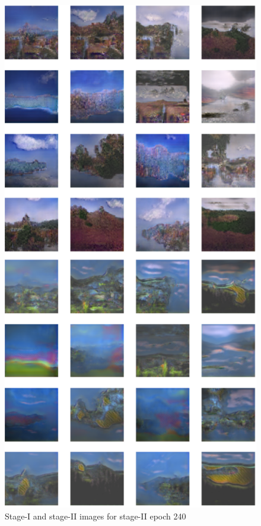 \documentclass{article}
\begin{document}
	\begin{figure}[h]
	\centering
	\includegraphics[scale=0.6]{images/epoch240_FID400.png}
	\caption{Stage-I and stage-II images for stage-II epoch 240}
	\end{figure}
\end{document}
